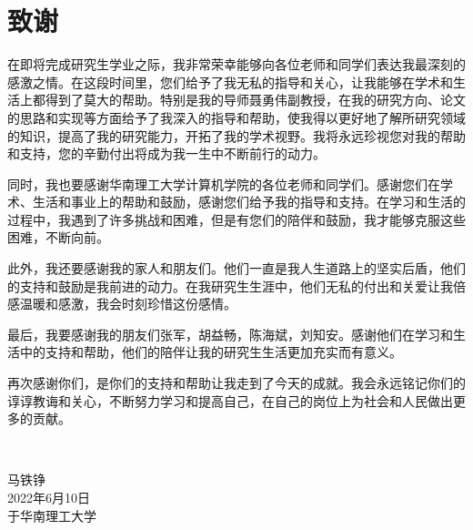 \chapter{致\texorpdfstring{\quad}{}谢}
在即将完成研究生学业之际，我非常荣幸能够向各位老师和同学们表达我最深刻的感激之情。在这段时间里，您们给予了我无私的指导和关心，让我能够在学术和生活上都得到了莫大的帮助。特别是我的导师聂勇伟副教授，在我的研究方向、论文的思路和实现等方面给予了我深入的指导和帮助，使我得以更好地了解所研究领域的知识，提高了我的研究能力，开拓了我的学术视野。我将永远珍视您对我的帮助和支持，您的辛勤付出将成为我一生中不断前行的动力。

同时，我也要感谢华南理工大学计算机学院的各位老师和同学们。感谢您们在学术、生活和事业上的帮助和鼓励，感谢您们给予我的指导和支持。在学习和生活的过程中，我遇到了许多挑战和困难，但是有您们的陪伴和鼓励，我才能够克服这些困难，不断向前。

此外，我还要感谢我的家人和朋友们。他们一直是我人生道路上的坚实后盾，他们的支持和鼓励是我前进的动力。在我研究生生涯中，他们无私的付出和关爱让我倍感温暖和感激，我会时刻珍惜这份感情。

最后，我要感谢我的朋友们张军，胡益畅，陈海斌，刘知安。感谢他们在学习和生活中的支持和帮助，他们的陪伴让我的研究生生活更加充实而有意义。

再次感谢你们，是你们的支持和帮助让我走到了今天的成就。我会永远铭记你们的谆谆教诲和关心，不断努力学习和提高自己，在自己的岗位上为社会和人民做出更多的贡献。

~\\

\begin{minipage}[t]{0.945\textwidth}%
	\begin{flushright}
		马铁铮\\
		2022年6月10日\\	%
		于华南理工大学
		\par\end{flushright}
\end{minipage}

